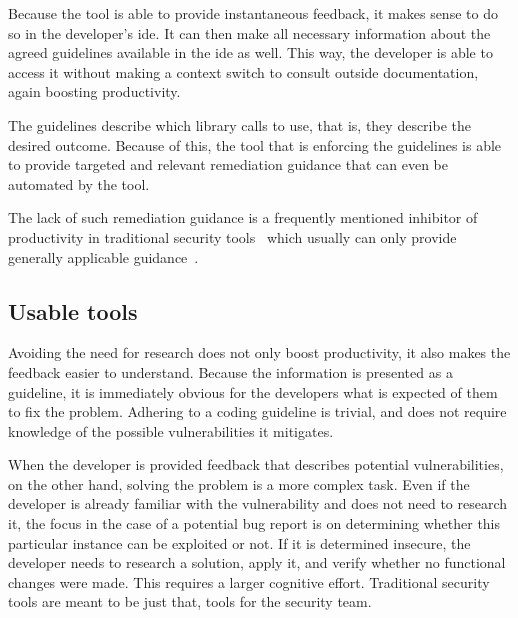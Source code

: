Because the tool is able to provide instantaneous feedback, it makes sense to do so in the developer's \gls{ide}.
It can then make all necessary information about the agreed guidelines available in the \gls{ide} as well.
This way, the developer is able to access it without making a context switch to consult outside documentation, again boosting productivity.

The guidelines describe which library calls to use, that is, they describe the desired outcome.
Because of this, the tool that is enforcing the guidelines is able to provide targeted and relevant remediation guidance that can even be automated by the tool.

The lack of such remediation guidance is a frequently mentioned inhibitor of productivity in traditional security tools~\cite{shiftleftsurvey} which usually can only provide generally applicable guidance~\cite{baset2017ide}.

\subsection{Usable tools}
Avoiding the need for research does not only boost productivity, it also makes the feedback easier to understand.
Because the information is presented as a guideline, it is immediately obvious for the developers what is expected of them to fix the problem. Adhering to a coding guideline is trivial, and does not require knowledge of the possible vulnerabilities it mitigates.

When the developer is provided feedback that describes potential vulnerabilities, on the other hand, solving the problem is a more complex task. Even if the developer is already familiar with the \gls{vulnerability} and does not need to research it, the focus in the case of a potential bug report is on determining whether this particular instance can be exploited or not. If it is determined insecure, the developer needs to research a solution, apply it, and verify whether no functional changes were made. This requires a larger cognitive effort. Traditional security tools are meant to be just that, tools for the security team.

